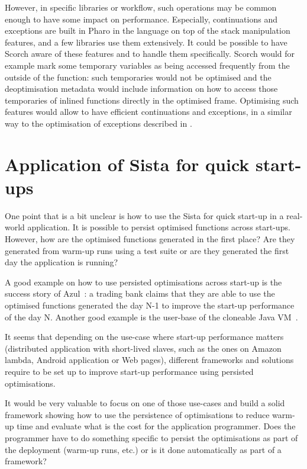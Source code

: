 \documentclass[a4paper,12pt,twoside]{../includes/ThesisStyle}
\begin{document}
However, in specific libraries or workflow, such operations may be common enough to have some impact on performance. Especially, continuations and exceptions are built in Pharo in the language on top of the stack manipulation features, and a few libraries use them extensively. It could be possible to have Scorch aware of these features and to handle them specifically. Scorch would for example mark some temporary variables as being accessed frequently from the outside of the function: such temporaries would not be optimised and the deoptimisation metadata would include information on how to access those temporaries of inlined functions directly in the optimised frame. Optimising such features would allow to have efficient continuations and exceptions, in a similar way to the optimisation of exceptions described in \cite{Ogas01a}. 

\section{Application of Sista for quick start-ups}
\label{sec:useCase}

One point that is a bit unclear is how to use the Sista for quick start-up in a real-world application. It is possible to persist optimised functions across start-ups. However, how are the optimised functions generated in the first place? Are they generated from warm-up runs using a test suite or are they generated the first day the application is running?

A good example on how to use persisted optimisations across start-up is the success story of Azul~\cite{Azul}: a trading bank claims that they are able to use the optimised functions generated the day N-1 to improve the start-up performance of the day N. Another good example is the user-base of the cloneable Java VM~\cite{Kawa07a}.

It seems that depending on the use-case where start-up performance matters (distributed application with short-lived slaves, such as the ones on Amazon lambda, Android application or Web pages), different frameworks and solutions require to be set up to improve start-up performance using persisted optimisations. 

It would be very valuable to focus on one of those use-cases and build a solid framework showing how to use the persistence of optimisations to reduce warm-up time and evaluate what is the cost for the application programmer. Does the programmer have to do something specific to persist the optimisations as part of the deployment (warm-up runs, etc.) or is it done automatically as part of a framework?
\end{document}
